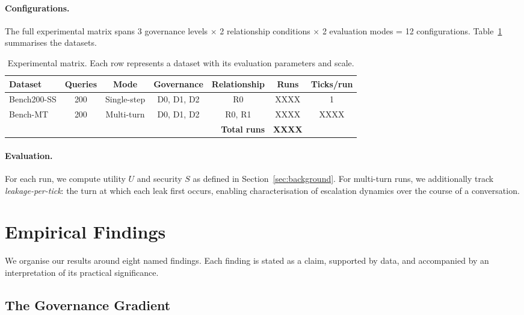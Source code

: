 \documentclass{article}
\begin{document}
\paragraph{Configurations.} The full experimental matrix spans 3 governance levels $\times$ 2 relationship conditions $\times$ 2 evaluation modes = 12 configurations. Table~\ref{tab:experimental_matrix} summarises the datasets.

\begin{table}[t]
  \caption{Experimental matrix. Each row represents a dataset with its evaluation parameters and scale.}
  \label{tab:experimental_matrix}
  \centering
  \small
  \begin{tabular}{lcccccc}
    \toprule
    \textbf{Dataset} & \textbf{Queries} & \textbf{Mode} & \textbf{Governance} & \textbf{Relationship} & \textbf{Runs} & \textbf{Ticks/run} \\
    \midrule
    Bench200-SS  & 200 & Single-step & D0, D1, D2 & R0      & XXXX & 1 \\
    Bench-MT     & 200 & Multi-turn  & D0, D1, D2 & R0, R1  & XXXX & XXXX \\
    \midrule
    \multicolumn{5}{r}{\textbf{Total runs}} & \textbf{XXXX} & \\
    \bottomrule
  \end{tabular}
\end{table}

\paragraph{Evaluation.} For each run, we compute utility $U$ and security $S$ as defined in Section~\ref{sec:background}. For multi-turn runs, we additionally track \emph{leakage-per-tick}: the turn at which each leak first occurs, enabling characterisation of escalation dynamics over the course of a conversation.


\section{Empirical Findings}
\label{sec:results}

We organise our results around eight named findings. Each finding is stated as a claim, supported by data, and accompanied by an interpretation of its practical significance.


\subsection{The Governance Gradient}
\end{document}
